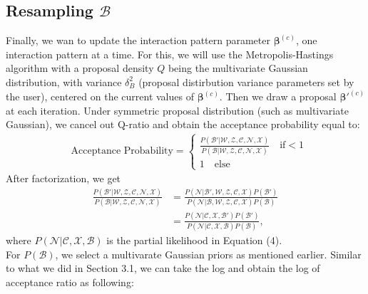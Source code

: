 \documentclass[a4paper]{article}
\begin{document}
\subsection{Resampling $\mathcal{B}$}
Finally, we wan to update the interaction pattern parameter $\boldsymbol{\beta}^{(c)}$, one interaction pattern at a time. For this, we will use the Metropolis-Hastings algorithm with a proposal density $Q$ being the multivariate Gaussian distribution, with variance $\delta^2_B$ (proposal distirbution variance parameters set by the
user), centered on the current values of $\boldsymbol{\beta}^{(c)}$. Then we draw a proposal $\boldsymbol{\beta}'^{(c)}$ at each iteration. Under symmetric proposal distribution (such as multivariate Gaussian), we cancel out Q-ratio and obtain the acceptance probability equal to:
\begin{equation}
\begin{split}
& \mbox{Acceptance Probability}=
\begin{cases}  \frac{P(\mathcal{B'}|\mathcal{W}, \mathcal{Z}, \mathcal{C}, \mathcal{N}, \mathcal{X})}{P(\mathcal{B}|\mathcal{W}, \mathcal{Z}, \mathcal{C}, \mathcal{N}, \mathcal{X})}\quad\text{if}  <1\\
1 \quad \text{else}
\end{cases}
\end{split}
\end{equation}
After factorization, we get
\begin{equation}
\begin{aligned}
\frac{P(\mathcal{B'}|\mathcal{W},\mathcal{Z}, \mathcal{C}, \mathcal{N}, \mathcal{X})}{P(\mathcal{B}|\mathcal{W}, \mathcal{Z}, \mathcal{C}, \mathcal{N}, \mathcal{X})} &=\frac{P(\mathcal{N}|\mathcal{B'}, \mathcal{W}, \mathcal{Z}, \mathcal{C}, \mathcal{X})P(\mathcal{B'})}{P(\mathcal{N}|\mathcal{B}, \mathcal{W}, \mathcal{Z},  \mathcal{C}, \mathcal{X})P(\mathcal{B})}\\&=\frac{P(\mathcal{N}|\mathcal{C}, \mathcal{X}, \mathcal{B'})P(\mathcal{B'})}{P(\mathcal{N}|\mathcal{C}, \mathcal{X}, \mathcal{B})P(\mathcal{B})},
\end{aligned}
\end{equation}
where $P(\mathcal{N}|\mathcal{C}, \mathcal{X}, \mathcal{B})$ is the partial likelihood in Equation (4).\\ \newline For $P(\mathcal{B})$, we select a multivarate Gaussian priors as mentioned earlier. Similar to what we did in Section 3.1, we can take the log and obtain the log of acceptance ratio as following:
\end{document}
